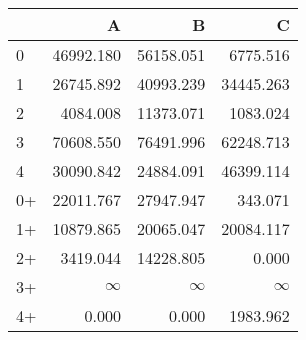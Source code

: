 \begin{tabular}{lrrr}
\toprule
     &         A &         B &         C \\
\midrule
 0   & \num{46992.180} & \num{56158.051} &  \num{6775.516} \\
 1   & \num{26745.892} & \num{40993.239} & \num{34445.263} \\
 2   &  \num{4084.008} & \num{11373.071} &  \num{1083.024} \\
 3   & \num{70608.550} & \num{76491.996} & \num{62248.713} \\
 4   & \num{30090.842} & \num{24884.091} & \num{46399.114} \\
 0+  & \num{22011.767} & \num{27947.947} &   \num{343.071} \\
 1+  & \num{10879.865} & \num{20065.047} & \num{20084.117} \\
 2+  &  \num{3419.044} & \num{14228.805} &     \num{0.000} \\
 3+  &  $\infty$    &  $\infty$    &  $\infty$    \\
 4+  &     \num{0.000} &     \num{0.000} &  \num{1983.962} \\
\bottomrule
\end{tabular}